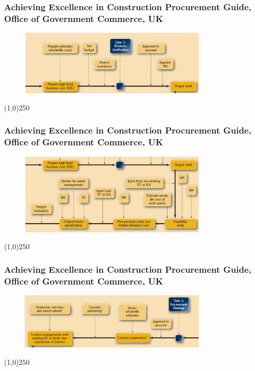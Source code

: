\begin{frame}
\frametitle{Achieving Excellence in Construction Procurement Guide, Office of Government Commerce, UK}
 \begin{figure}
 	\centering
 		\includegraphics[width = 9cm]{images/life3.jpg}
 	\label{fig:UKlife3}
 \end{figure}
\end{frame}
\begin{center}\line(1,0){250}\end{center}



\begin{frame}
\frametitle{Achieving Excellence in Construction Procurement Guide, Office of Government Commerce, UK}
 \begin{figure}
 	\centering
 		\includegraphics[width = 9cm]{images/life4.jpg}
 	\label{fig:UKlife4}
 \end{figure}
\end{frame}
\begin{center}\line(1,0){250}\end{center}



\begin{frame}
\frametitle{Achieving Excellence in Construction Procurement Guide, Office of Government Commerce, UK}
 \begin{figure}
 	\centering
 		\includegraphics[width = 9cm]{images/life5.jpg}
 	\label{fig:UKlife5}
 \end{figure}
\end{frame}
\begin{center}\line(1,0){250}\end{center}



